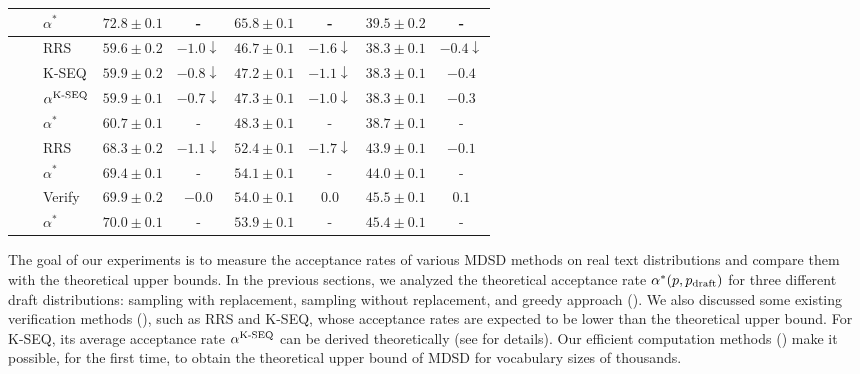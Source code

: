 \documentclass{article}
\makeatletter
\newcommand{\crvspace}{\@ifstar\crvspacestar\crvspacenostar}
\newcommand{\crvspacenostar}[1]{}
\newcommand{\crvspacestar}[1]{}
\makeatother
\begin{document}
\begin{table}[ht]
{\begin{tabular}{lllcccccc}
 &  & $\alpha^\ast$ & $\bm{72.8} \pm 0.1$ & - & $\bm{65.8} \pm 0.1$ & - & $\bm{39.5} \pm 0.2$ & - \\
\midrule
{} &  & RRS & $59.6 \pm 0.2$ & $-1.0\downarrow$ & $46.7 \pm 0.1$ & $-1.6\downarrow$ & $38.3 \pm 0.1$ & $-0.4\downarrow$ \\
 &  & K-SEQ & $59.9 \pm 0.2$ & $-0.8\downarrow$ & $47.2 \pm 0.1$ & $-1.1\downarrow$ & $\bm{38.3} \pm 0.1$ & $-0.4$ \\
 &  & $\alpha^{\operatorname{K-SEQ}}$ & $59.9 \pm 0.1$ & $-0.7\downarrow$ & $47.3 \pm 0.1$ & $-1.0\downarrow$ & $\bm{38.3} \pm 0.1$ & $-0.3$ \\
 &  & $\alpha^\ast$ & $\bm{60.7} \pm 0.1$ & - & $\bm{48.3} \pm 0.1$ & - & $\bm{38.7} \pm 0.1$ & - \\
\cmidrule(r){2-9} &  & RRS & $68.3 \pm 0.2$ & $-1.1\downarrow$ & $52.4 \pm 0.1$ & $-1.7\downarrow$ & $\bm{43.9} \pm 0.1$ & $-0.1$ \\
 &  & $\alpha^\ast$ & $\bm{69.4} \pm 0.1$ & - & $\bm{54.1} \pm 0.1$ & - & $\bm{44.0} \pm 0.1$ & - \\
\cmidrule(r){2-9} &  & Verify & $\bm{69.9} \pm 0.2$ & $-0.0$ & $\bm{54.0} \pm 0.1$ & $0.0$ & $\bm{45.5} \pm 0.1$ & $0.1$ \\
 &  & $\alpha^\ast$ & $\bm{70.0} \pm 0.1$ & - & $\bm{53.9} \pm 0.1$ & - & $\bm{45.4} \pm 0.1$ & - \\

\bottomrule
\end{tabular} }
\crvspace{-10pt}
\end{table} 
The goal of our experiments is to measure the acceptance rates of various MDSD methods on real text distributions and compare them with the theoretical upper bounds. In the previous sections, we analyzed the theoretical acceptance rate $\alpha^\ast(p,p_{\operatorname{draft}})$ for three different draft distributions: sampling with replacement, sampling without replacement, and greedy approach (). We also discussed some existing verification methods (), such as RRS and K-SEQ, whose acceptance rates are expected to be lower than the theoretical upper bound. For K-SEQ, its average acceptance rate $\alpha^{\operatorname{K-SEQ}}$ can be derived theoretically (see  for details). Our efficient computation methods () make it possible, for the first time, to obtain the theoretical upper bound of MDSD for vocabulary sizes of thousands.
\end{document}
